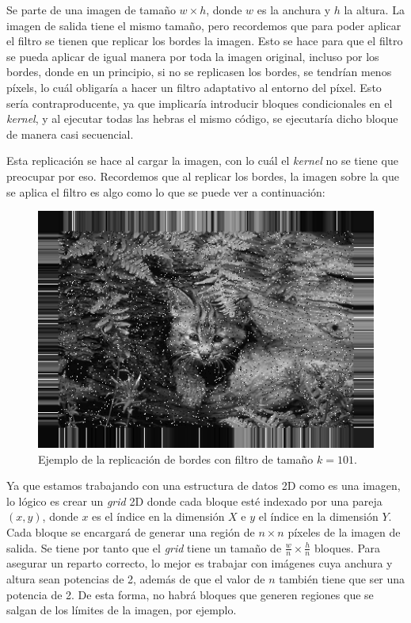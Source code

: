\documentclass[11pt,a4paper]{article}
\begin{document}
Se parte de una imagen de tamaño $w \times h$, donde $w$ es la anchura y $h$ la altura. La
imagen de salida tiene el mismo tamaño, pero recordemos que para poder aplicar el filtro se
tienen que replicar los bordes la imagen. Esto se hace para que el filtro se pueda aplicar de
igual manera por toda la imagen original, incluso por los bordes, donde en un principio, si
no se replicasen los bordes, se tendrían menos píxels, lo cuál obligaría a hacer un filtro
adaptativo al entorno del píxel. Esto sería contraproducente, ya que implicaría introducir
bloques condicionales en el \textit{kernel}, y al ejecutar todas las hebras el mismo código,
se ejecutaría dicho bloque de manera casi secuencial.

Esta replicación se hace al cargar la imagen, con lo cuál el \textit{kernel} no se tiene que
preocupar por eso. Recordemos que al replicar los bordes, la imagen sobre la que se aplica el
filtro es algo como lo que se puede ver a continuación:

\begin{figure}[H]
  \centering
  \includegraphics[scale=0.6]{img/borders-cat}
  \caption{Ejemplo de la replicación de bordes con filtro de tamaño $k = 101$.}
  \label{fig:borders-cat}
\end{figure}

Ya que estamos trabajando con una estructura de datos 2D como es una imagen, lo lógico es
crear un \textit{grid} 2D donde cada bloque esté indexado por una pareja $(x, y)$, donde $x$
es el índice en la dimensión $X$ e $y$ el índice en la dimensión $Y$. Cada bloque se
encargará de generar una región de $n \times n$ píxeles de la imagen de salida.
Se tiene por tanto que el \textit{grid} tiene un tamaño de $\frac{w}{n} \times \frac{h}{n}$
bloques. Para asegurar un reparto correcto, lo mejor es trabajar con imágenes cuya anchura y
altura sean potencias de 2, además de que el valor de $n$ también tiene que ser una potencia
de 2. De esta forma, no habrá bloques que generen regiones que se salgan de los límites de la
imagen, por ejemplo.
\end{document}
